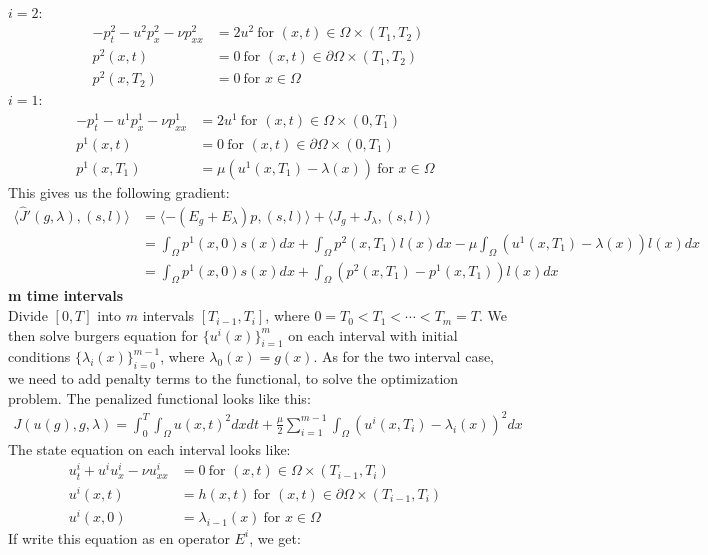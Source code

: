 \documentclass[11pt,a4paper]{report}
\begin{document}
\\
$i=2$:
\begin{align*}
-p_t^2 -u^2p_x^2 - \nu p_{xx}^2 &= 2u^2 \ \text{for $(x,t)\in \Omega\times(T_1,T_2)$}\\
p^2(x,t) &= 0 \ \text{for $(x,t) \in\partial\Omega\times(T_1,T_2)$ } \\
p^2(x,T_2) &= 0 \ \text{for $x \in\Omega$ }
\end{align*}
$i=1$:
\begin{align*}
-p_t^1 -u^1p_x^1 - \nu p_{xx}^1 &= 2u^1 \ \text{for $(x,t)\in \Omega\times(0,T_1)$}\\
p^1(x,t) &= 0 \ \text{for $(x,t) \in\partial\Omega\times(0,T_1)$ } \\
p^1(x,T_1) &= \mu(u^1(x,T_1)-\lambda(x)) \ \text{for $x \in\Omega$ }
\end{align*}
This gives us the following gradient:
\begin{align*}
\langle \hat{J}'(g,\lambda), (s,l)\rangle &=\langle -(E_g+E_{\lambda})p , (s,l)\rangle + \langle J_g+J_{\lambda}, (s,l)\rangle \\
&= \int_{\Omega} p^1(x,0)s(x)dx + \int_{\Omega} p^2(x,T_1)l(x)dx -\mu\int_{\Omega} (u^1(x,T_1)-\lambda(x))l(x)dx \\
&= \int_{\Omega} p^1(x,0)s(x)dx + \int_{\Omega} (p^2(x,T_1)-p^1(x,T_1))l(x)dx
\end{align*}
\textbf{m time intervals}
\\
Divide $[0,T]$ into $m$ intervals $[T_{i-1},T_i]$, where $0=T_0<T_1<\cdots<T_m=T$. We then solve burgers equation for $\{u^i(x)\}_{i=1}^m$ on each interval with initial conditions $\{\lambda_i(x)\}_{i=0}^{m-1}$, where $\lambda_0(x)=g(x)$. As for the two interval case, we need to add penalty terms to the functional, to solve the optimization problem. The penalized functional looks like this:
\begin{align*}
J(u(g),g,\lambda) = \int_0^T\int_{\Omega} u(x,t)^2 dxdt + \frac{\mu}{2}\sum_{i=1}^{m-1}\int_{\Omega} (u^i(x,T_i)-\lambda_i(x))^2dx
\end{align*}
The state equation on each interval looks like:
\begin{align*}
u_t^i + u^iu_x^i - \nu u_{xx}^i &= 0 \ \text{for $(x,t)\in \Omega\times(T_{i-1},T_i)$}\\
u^i(x,t) &= h(x,t) \ \text{for $(x,t) \in\partial\Omega\times(T_{i-1},T_i)$ } \\
u^i(x,0) &= \lambda_{i-1}(x) \ \text{for $x \in\Omega$ }
\end{align*} 
If write this equation as en operator $E^i$, we get:
\end{document}
